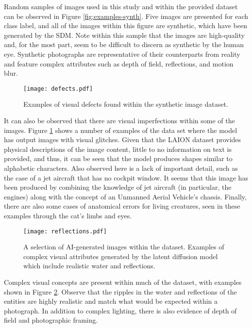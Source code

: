 \documentclass{article}
\begin{document}
Random samples of images used in this study and within the provided dataset can be observed in Figure \ref{fig:examples-synth}. Five images are presented for each class label, and all of the images within this figure are synthetic, which have been generated by the SDM. Note within this sample that the images are high-quality and, for the most part, seem to be difficult to discern as synthetic by the human eye. Synthetic photographs are representative of their counterparts from reality and feature complex attributes such as depth of field, reflections, and motion blur. 


\begin{figure}
    \centering
    \texttt{[image: defects.pdf]}
    \caption{Examples of visual defects found within the synthetic image dataset.}
    \label{fig:defects}
\end{figure}

It can also be observed that there are visual imperfections within some of the images. Figure \ref{fig:defects} shows a number of examples of the data set where the model has output images with visual glitches. Given that the LAION dataset provides physical descriptions of the image content, little to no information on text is provided, and thus, it can be seen that the model produces shapes similar to alphabetic characters. Also observed here is a lack of important detail, such as the case of a jet aircraft that has no cockpit window. It seems that this image has been produced by combining the knowledge of jet aircraft (in particular, the engines) along with the concept of an Unmanned Aerial Vehicle's chassis. Finally, there are also some cases of anatomical errors for living creatures, seen in these examples through the cat's limbs and eyes. 

\begin{figure}
    \centering
    \texttt{[image: reflections.pdf]}
    \caption{A selection of AI-generated images within the dataset. Examples of complex visual attributes generated by the latent diffusion model which include realistic water and reflections. }
    \label{fig:reflections}
\end{figure}

Complex visual concepts are present within much of the dataset, with examples shown in Figure \ref{fig:reflections}. Observe that the ripples in the water and reflections of the entities are highly realistic and match what would be expected within a photograph. In addition to complex lighting, there is also evidence of depth of field and photographic framing.
\end{document}
